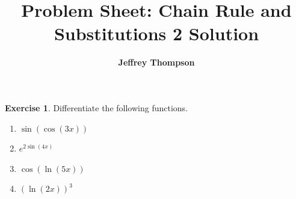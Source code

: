 \documentclass[a4paper]{article}
\theoremstyle{plain}
\theoremstyle{definition}
\newtheorem{exercise}{Exercise}
\numberwithin{equation}{subsection}
\begin{document}
\title{\textbf{Problem Sheet: Chain Rule and Substitutions 2 Solution}}
\author{\textbf{Jeffrey Thompson}}
\maketitle

\begin{exercise}
Differentiate the following functions.
\begin{enumerate}
    \item $\sin(\cos(3x))$
    \item $e^{2\sin(4x)}$
    \item $\cos(\ln(5x))$
    \item $(\ln(2x))^3$
\end{enumerate}
\end{exercise}
\end{document}
